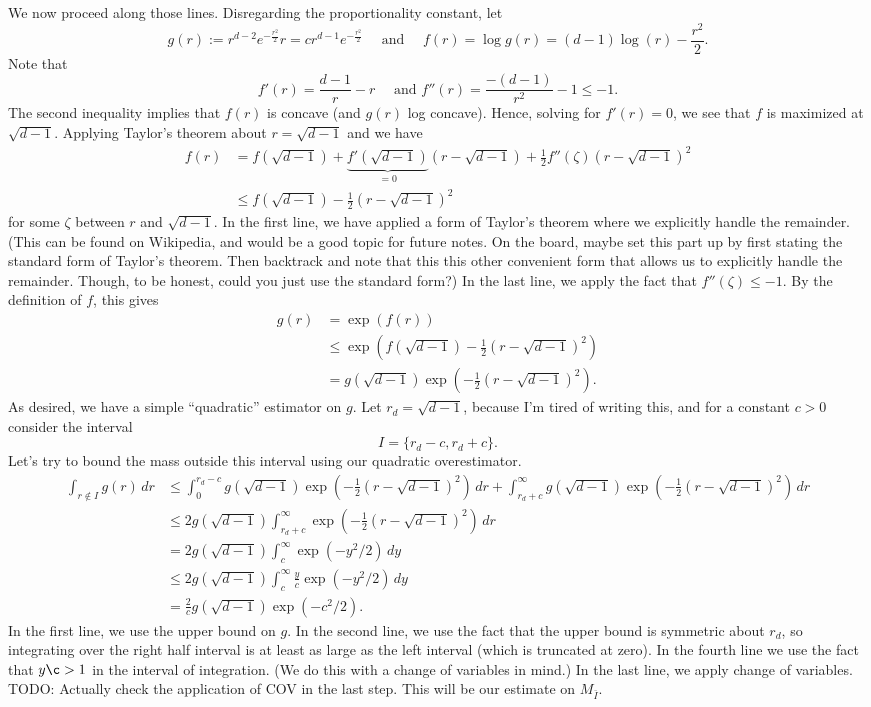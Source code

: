 \documentclass{book}
\newcommand{\dy}{\, dy}
\newcommand{\dr}{\, dr}
\begin{document}
We now proceed along those lines. 
Disregarding the proportionality constant, let 
$$
g(r) := r^{d - 2}e^{-\frac{r^2}{2}}r = cr^{d-1}e^{-\frac{r^2}{2}} \quad \mbox{ and } \quad f(r) = \log g(r) = (d-1) \log(r) - \frac{r^2}{2}.
$$
Note that 
$$
f'(r) = \frac{d-1}{r} - r \quad \mbox{ and } f''(r) = \frac{-(d-1)}{r^2} - 1 \leq -1.
$$
The second inequality implies that $f(r)$ is concave (and $g(r)$ log concave). Hence, solving for $f'(r) = 0$, we see that $f$ is maximized at $\sqrt{d-1}$. Applying Taylor's theorem about $r=\sqrt{d-1}$ and we have
\begin{align}
\label{eq:gauss-sphere-f-taylor}
f(r) & = f(\sqrt{d-1}) + \underbrace{f'(\sqrt{d-1})}_{=0}(r-\sqrt{d-1}) + \frac{1}{2}f''(\zeta)(r-\sqrt{d-1})^2\\ 
& \leq f(\sqrt{d-1}) - \frac{1}{2}(r-\sqrt{d-1})^2
\end{align}
for some $\zeta$ between $r$ and $\sqrt{d-1}$. In the first line, we have applied a form of Taylor's theorem where we explicitly handle the remainder. (This can be found on Wikipedia, and would be a good topic for future notes. On the board, maybe set this part up by first stating the standard form of Taylor's theorem. Then backtrack and note that this this other convenient form that allows us to explicitly handle the remainder. Though, to be honest, could you just use the standard form?) In the last line, we apply the fact that $f''(\zeta) \leq -1$. 
By the definition of $f$, this gives
\begin{align}
g(r) & = \exp(f(r)) \\
& \leq \exp(f(\sqrt{d-1}) - \frac{1}{2}(r-\sqrt{d-1})^2 )\\
&  = g(\sqrt{d-1})\exp(-\frac{1}{2}(r-\sqrt{d-1})^2 ).
\end{align}
As desired, we have a simple ``quadratic'' estimator on $g$. Let $r_d = \sqrt{d-1}$, because I'm tired of writing this, and for a constant $c>0$ consider the interval 
$$
I = \{r_d - c, r_d+c\}. 
$$
Let's try to bound the mass outside this interval using our quadratic overestimator. 
\begin{align}
\int_{r\not\in I} g(r)\dr & \leq \int_0^{r_d - c} g(\sqrt{d-1})\exp(-\frac{1}{2}(r-\sqrt{d-1})^2 ) \dr + \int _{r_d+c}^{\infty} g(\sqrt{d-1})\exp(-\frac{1}{2}(r-\sqrt{d-1})^2 )\dr\\
& \leq 2g(\sqrt{d-1})\int _{r_d+c}^{\infty} \exp(-\frac{1}{2}(r-\sqrt{d-1})^2 )\dr\\
& = 2g(\sqrt{d-1})\int _{c}^{\infty} \exp(-y^2/2)\dy\\
& \leq 2g(\sqrt{d-1}) \int _{c}^{\infty} \frac{y}{c}\exp(-y^2/2)\dy\\
& = \frac{2}{c}g(\sqrt{d-1})\exp(-c^2/2).
\end{align}
In the first line, we use the upper bound on $g$. In the second line, we use the fact that the upper bound is symmetric about $r_d$, so integrating over the right half interval is at least as large as the left interval (which is truncated at zero). 
In the fourth line we use the fact that $y\c > 1$ in the interval of integration. (We do this with a change of variables in mind.) In the last line, we apply change of variables. TODO: Actually check the application of COV in the last step. This will be our estimate on $M_{\bar I}$. 
\end{document}
